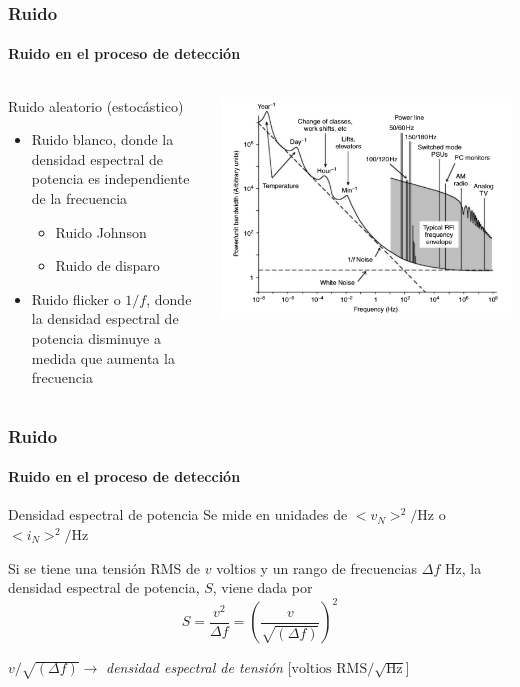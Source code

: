 \documentclass{beamer}
\begin{document}
\begin{frame}
\frametitle{Ruido}
\framesubtitle{Ruido en el proceso de detección}
\begin{columns}
\begin{column}{0.5\textwidth}
\begin{block}{Ruido aleatorio (estocástico)}
\begin{itemize}
\item Ruido blanco, donde la densidad espectral de potencia es
independiente de la frecuencia
\begin{itemize}
\item Ruido Johnson
\item Ruido de disparo 
\end{itemize}
\item Ruido flicker o $1/f$, donde la densidad espectral de potencia disminuye a
medida que aumenta la frecuencia
\end{itemize}
\end{block}
\end{column}
\begin{column}{0.5\textwidth}
\begin{center}
\includegraphics[width=\textwidth]{d1/environmental_noise_spectrum}
\end{center}
\end{column}
\end{columns}
\end{frame} 

\begin{frame}
\frametitle{Ruido}
\framesubtitle{Ruido en el proceso de detección}
\begin{block}{Densidad espectral de potencia}
Se mide en unidades de $<\!v_N\!>^2/\text{Hz}$ o $<\!i_N\!>^2/\text{Hz}$

Si se tiene una tensión RMS de $v$ voltios y un rango de frecuencias $\Delta f$
Hz, la densidad espectral de potencia, $S$, viene dada por
{\color{blue}$$S = \frac{v^2}{\Delta f} = \left(\frac{v}{\sqrt{(\Delta
f)}}\right)^2$$}

$v/\sqrt{(\Delta f)} \rightarrow$ \textit{densidad espectral de tensión}
[$\text{voltios RMS}/\sqrt{\text{Hz}}$]
\end{block}
\end{frame} 
\end{document}
